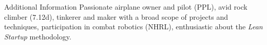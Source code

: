 \begin{rubric}{Additional Information}
\entry*[Interests]%
Passionate airplane owner and pilot (PPL), 
avid rock climber (7.12d), 
tinkerer and maker with a broad scope of projects and techniques, 
participation in combat robotics (NHRL), 
enthusiastic about the \textit{Lean Startup} methodology.
\end{rubric}
